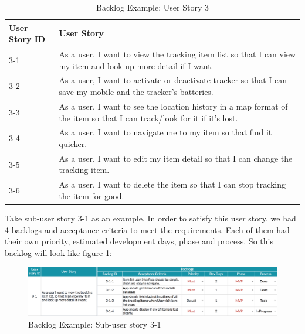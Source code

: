 \documentclass[12pt,a4paper]{article}
\begin{document}
          \begin{table}[H]
            \centering
              \begin{tabularx}{\textwidth}{l X}
                \hline
                 User Story ID & User Story \\ \hline
                 3-1 & As a user, I want to view the tracking item list so that I can view my item and look up more detail if I want. \\
                 3-2 & As a user, I want to activate or deactivate tracker so that I can save my mobile and the tracker's batteries. \\
                 3-3 & As a user, I want to see the location history in a map format of the item so that I can track/look for it if it's lost. \\
                 3-4 & As a user, I want to navigate me to my item so that find it quicker. \\
                 3-5 & As a user, I want to edit my item detail so that I can change the tracking item. \\
                 3-6 & As a user, I want to delete the item so that I can stop tracking the item for good. \\
                \hline
              \end{tabularx}
              \caption[Table caption text]{Backlog Example: User Story 3}
              \label{table:Backlog Example: User Story 3}
          \end{table}   
          
          Take sub-user story 3-1 as an example. In order to satisfy this user story, we had 4 backlogs and acceptance criteria to meet the requirements. Each of them had their own priority, estimated development days, phase and process. So this backlog will look like figure \ref{fig:Backlog Example: Sub-user story 3-1}:
          
          \begin{figure}[H]
            \centering
            \includegraphics[width=1\textwidth]{../assets/development-records-backlog-example.png}
            \caption{Backlog Example: Sub-user story 3-1}
            \label{fig:Backlog Example: Sub-user story 3-1}
          \end{figure}
          
\end{document}
